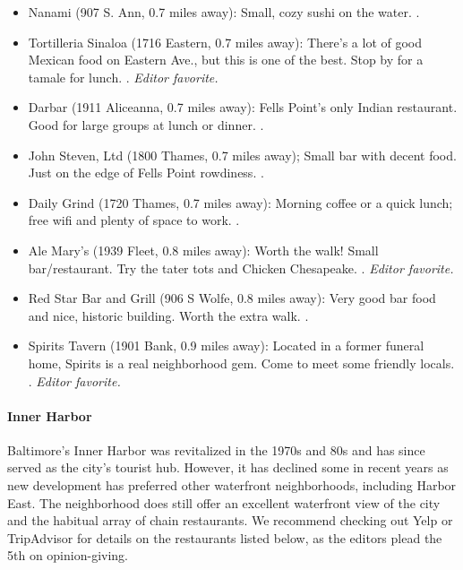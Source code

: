 \begin{itemize}
\item{Nanami (907 S. Ann, 0.7 miles away): Small, cozy sushi on the water. \postdoc.}
\item{Tortilleria Sinaloa (1716 Eastern, 0.7 miles away): There's a lot of good Mexican food on Eastern Ave., but this is one of the best. Stop by for a tamale for lunch. \gradstudent. \it{Editor favorite}.}
\item{Darbar (1911 Aliceanna, 0.7 miles away): Fells Point's only Indian restaurant. Good for large groups at lunch or dinner. \postdoc.}
\item{John Steven, Ltd (1800 Thames, 0.7 miles away); Small bar with decent food. Just on the edge of Fells Point rowdiness. \postdoc.}
\item{Daily Grind (1720 Thames, 0.7 miles away): Morning coffee or a quick lunch; free wifi and plenty of space to work. \gradstudent.}
\item{Ale Mary's (1939 Fleet, 0.8 miles away): Worth the walk! Small bar/restaurant. Try the tater tots and Chicken Chesapeake. \postdoc. \it{Editor favorite}.}
\item{Red Star Bar and Grill (906 S Wolfe, 0.8 miles away): Very good bar food and nice, historic building. Worth the extra walk. \postdoc.}
\item{Spirits Tavern (1901 Bank, 0.9 miles away): Located in a former funeral home, Spirits is a real neighborhood gem. Come to meet some friendly locals. \gradstudent. \it{Editor favorite}.}
\end{itemize}

\paragraph*{Inner Harbor}
Baltimore's Inner Harbor was revitalized in the 1970s and 80s and has since served as the city's tourist hub. However, it has declined some in recent years as new development has preferred other waterfront neighborhoods, including Harbor East. The neighborhood does still offer an excellent waterfront view of the city and the habitual array of chain restaurants. We recommend checking out Yelp or TripAdvisor for details on the restaurants listed below, as the editors plead the 5th on opinion-giving.

